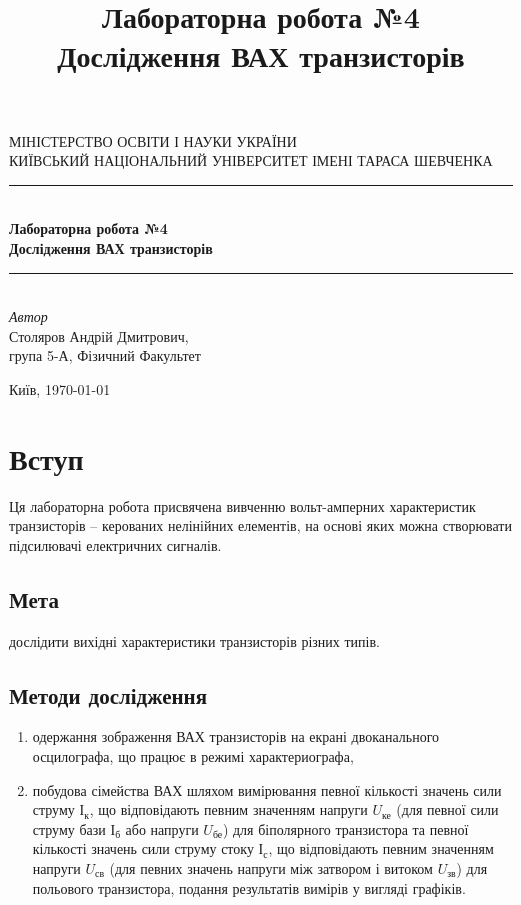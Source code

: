 \documentclass[
  ukrainian,
  14pt
]{extreport}
\author{}
\title{\Huge Лабораторна робота №4 \\\Large Дослідження ВАХ транзисторів}
\date{}
\begin{document}
\begin{titlepage} 
	\newcommand{\HRule}{\rule{\linewidth}{0.5mm}} 
	
	\center 
	
	\textsc{\Large МІНІСТЕРСТВО ОСВІТИ І НАУКИ УКРАЇНИ\\ \Large КИЇВСЬКИЙ НАЦІОНАЛЬНИЙ УНІВЕРСИТЕТ ІМЕНІ ТАРАСА ШЕВЧЕНКА}\\[1.5cm] 

	
	\HRule\\[0.4cm]
	
	{\huge \bfseries  Лабораторна робота №4 \\\Large \bfseries Дослідження ВАХ транзисторів
    }\\[0.4cm]
	
	\HRule\\[1.5cm]

	
	

	{\large\textit{Автор}}\\
	\large Столяров Андрій Дмитрович, \\\large група 5-А, Фізичний Факультет 
	
	
	\vfill\vfill\vfill 
	\vfill
	{\normalsize Київ, \today} 
\end{titlepage}
\tableofcontents
\clearpage
\section{Вступ}
Ця лабораторна робота присвячена вивченню вольт-амперних
характеристик транзисторів – керованих нелінійних елементів, на основі
яких можна створювати підсилювачі електричних сигналів.

\subsection{Мета}
дослідити вихідні характеристики транзисторів різних типів.

\subsection{Методи дослідження}
\begin{enumerate}
    \item одержання зображення ВАХ транзисторів на екрані двоканального
    осцилографа, що працює в режимі характериографа,
    \item побудова сімейства ВАХ шляхом вимірювання певної кількості
    значень сили струму $І_{\text{к}}$, що відповідають певним значенням напруги $U_{\text{ке}}$
    (для певної сили струму бази $І_{\text{б}}$ або напруги $U_{\text{бе}}$) для біполярного
    транзистора та певної кількості значень сили струму стоку $І_{\text{с}}$, що
    відповідають певним значенням напруги $U_{\text{св}}$ (для певних значень напруги
    між затвором і витоком $U_{\text{зв}}$) для польового транзистора, подання
    результатів вимірів у вигляді графіків.
\end{enumerate}
\end{document}
